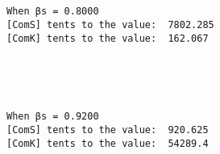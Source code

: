 \documentclass[11pt]{article}
\begin{document}
    \begin{center}
    \end{center}
    { \hspace*{\fill} \\}
    
    \begin{center}
    \end{center}
    { \hspace*{\fill} \\}
    
    \begin{Verbatim}[commandchars=\\\{\}]
When βs = 0.8000
[ComS] tents to the value:  7802.285
[ComK] tents to the value:  162.067

    \end{Verbatim}

    \begin{center}
    \end{center}
    { \hspace*{\fill} \\}
    
    \begin{center}
    \end{center}
    { \hspace*{\fill} \\}
    
    \begin{Verbatim}[commandchars=\\\{\}]
When βs = 0.9200
[ComS] tents to the value:  920.625
[ComK] tents to the value:  54289.4

    \end{Verbatim}

    \begin{center}
    \end{center}
    { \hspace*{\fill} \\}
    
    \begin{center}
    \end{center}
    { \hspace*{\fill} \\}
    
\end{document}

